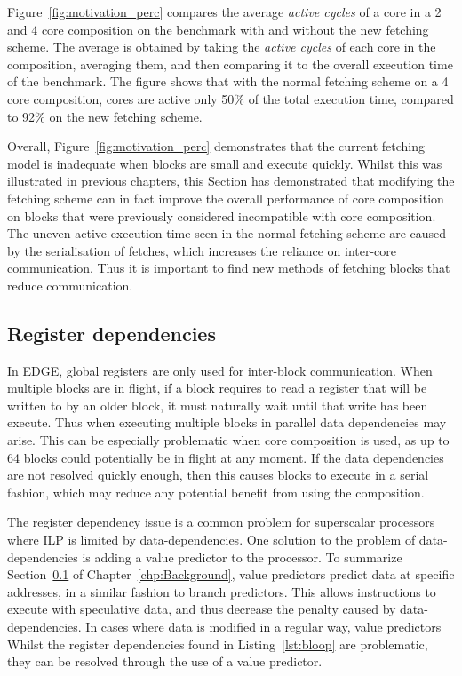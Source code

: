 Figure~\ref{fig:motivation_perc} compares the average \textit{active cycles} of a core in a 2 and 4 core composition on the  benchmark with and without the new fetching scheme.
The average is obtained by taking the \textit{active cycles} of each core in the composition, averaging them, and then comparing it to the overall execution time of the benchmark.
The figure shows that with the normal fetching scheme on a 4 core composition, cores are active only 50\% of the total execution time, compared to 92\% on the new fetching scheme.

Overall, Figure~\ref{fig:motivation_perc} demonstrates that the current fetching model is inadequate when blocks are small and execute quickly.
Whilst this was illustrated in previous chapters, this Section has demonstrated that modifying the fetching scheme can in fact improve the overall performance of core composition on blocks that were previously considered incompatible with core composition.
The uneven active execution time seen in the normal fetching scheme are caused by the serialisation of fetches, which increases the reliance on inter-core communication.
Thus it is important to find new methods of fetching blocks that reduce communication.

\subsection{Register dependencies}

In EDGE, global registers are only used for inter-block communication.
When multiple blocks are in flight, if a block requires to read a register that will be written to by an older block, it must naturally wait until that write has been execute.
Thus when executing multiple blocks in parallel data dependencies may arise.
This can be especially problematic when core composition is used, as up to 64 blocks could potentially be in flight at any moment.
If the data dependencies are not resolved quickly enough, then this causes blocks to execute in a serial fashion, which may reduce any potential benefit from using the composition.

The register dependency issue is a common problem for superscalar processors~\cite{} where ILP is limited by data-dependencies.
One solution to the problem of data-dependencies is adding a value predictor to the processor.
To summarize Section~\ref{} of Chapter~\ref{chp:Background}, value predictors predict data at specific addresses, in a similar fashion to branch predictors.
This allows instructions to execute with speculative data, and thus decrease the penalty caused by data-dependencies.
In cases where data is modified in a regular way, value predictors 
Whilst the register dependencies found in Listing~\ref{lst:bloop} are problematic, they can be resolved through the use of a value predictor.

